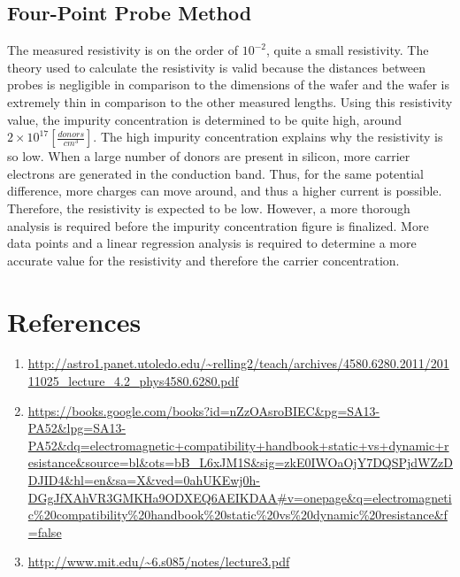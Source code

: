 \documentclass{article}
\begin{document}
	\subsection{Four-Point Probe Method}
The measured resistivity is on the order of $10^{-2}$, quite a small resistivity. The theory used to calculate the resistivity is valid because the distances between probes is negligible in comparison to the dimensions of the wafer and the wafer is extremely thin in comparison to the other measured lengths. Using this resistivity value, the impurity concentration is determined to be quite high, around $2 \times 10^{17} [\frac{donors}{cm^3}]$. The high impurity concentration explains why the resistivity is so low. When a large number of donors are present in silicon, more carrier electrons are generated in the conduction band. Thus, for the same potential difference, more charges can move around, and thus a higher current is possible. Therefore, the resistivity is expected to be low. However, a more thorough analysis is required before the impurity concentration figure is finalized. More data points and a linear regression analysis is required to determine a more accurate value for the resistivity and therefore the carrier concentration.

	\section{References}
	\begin{enumerate}
		\item \label{itm:resistivity_simplification} \url{http://astro1.panet.utoledo.edu/~relling2/teach/archives/4580.6280.2011/20111025_lecture_4.2_phys4580.6280.pdf}
		\item \label{itm:electromagnetic_compatibility} \url{https://books.google.com/books?id=nZzOAsroBIEC&pg=SA13-PA52&lpg=SA13-PA52&dq=electromagnetic+compatibility+handbook+static+vs+dynamic+resistance&source=bl&ots=bB_L6xJM1S&sig=zkE0IWOaOjY7DQSPjdWZzDDJID4&hl=en&sa=X&ved=0ahUKEwj0h-DGgJfXAhVR3GMKHa9ODXEQ6AEIKDAA#v=onepage&q=electromagnetic\%20compatibility\%20handbook\%20static\%20vs\%20dynamic\%20resistance&f=false}
		\item \label{itm:best_fit_line} \url{http://www.mit.edu/~6.s085/notes/lecture3.pdf}
	\end{enumerate}
\end{document}
